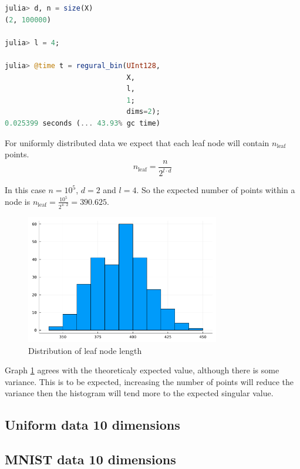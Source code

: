 \documentclass{juliacon}
\begin{document}
\begin{lstlisting}[language = Julia]
julia> d, n = size(X)
(2, 100000)

julia> l = 4;

julia> @time t = regural_bin(UInt128,
                             X,
                             l,
                             1;
                             dims=2);
0.025399 seconds (... 43.93% gc time)
\end{lstlisting}

For uniformly distributed data we expect that each leaf node will contain
$n_{\textrm{leaf}}$ points.
$$n_{\textrm{leaf}} = \frac{n}{2^{l\cdot d}}$$

In this case $n = 10^5$, $d = 2$ and $l = 4$. So the expected number of points within a
node is $n_{\textrm{leaf}} = \frac{10^5}{2^{4\cdot 2}} =390.625$.

\begin{figure}[!ht]
  \centerline{
    \includegraphics[width=20pc]{figures/uniform_2d/hist.png}
  }
  \caption{ Distribution of leaf node length }
  \label{uniform-2d-hist}
\end{figure}

Graph \ref{uniform-2d-hist} agrees with the theoreticaly expected value, although there
is some variance. This is to be expected, increasing the number of points will reduce
the variance then the histogram will tend more to the expected singular value.

\subsection{Uniform data 10 dimensions}
\subsection{MNIST data 10 dimensions}
\end{document}
